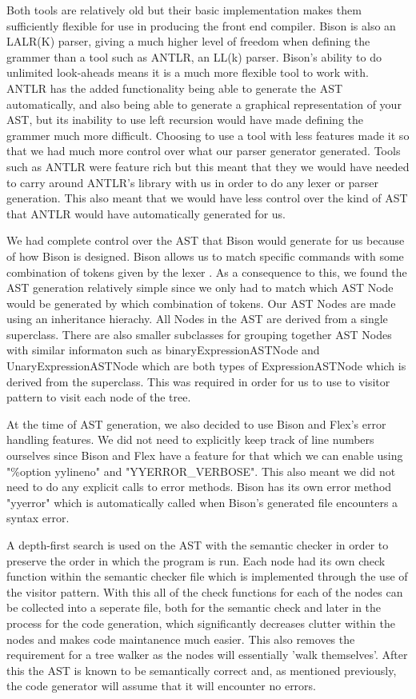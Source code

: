 \documentclass[8pt, a4paper]{article}
\begin{document}
Both tools are relatively old but their basic implementation makes them sufficiently flexible for use in producing the front end compiler. Bison is also an LALR(K) parser, giving a much higher level of freedom when defining the grammer than a tool such as ANTLR, an LL(k) parser. Bison's ability to do unlimited look-aheads means it is a much more flexible tool to work with. ANTLR has the added functionality being able to generate the AST automatically, and also being able to generate a graphical representation of your AST, but its inability to use left recursion would have made defining the grammer much more difficult. Choosing to use a tool with less features made it so that we had much more control over what our parser generator generated. Tools such as ANTLR were feature rich but this meant that they we would have needed to carry around ANTLR's library with us in order to do any lexer or parser generation. This also meant that we would have less control over the kind of AST that ANTLR would have automatically generated for us.

We had complete control over the AST that Bison would generate for us because of how Bison is designed. Bison allows us to match specific commands with some combination of tokens given by the lexer . As a consequence to this, we found the AST generation relatively simple since we only had to match which AST Node would be generated by which combination of tokens. Our AST Nodes are made using an inheritance hierachy. All Nodes in the AST are derived from a single superclass. There are also smaller subclasses for grouping together AST Nodes with similar informaton such as binaryExpressionASTNode and UnaryExpressionASTNode which are both types of ExpressionASTNode which is derived from the superclass. This was required in order for us to use to visitor pattern to visit each node of the tree.  

At the time of AST generation, we also decided to use Bison and Flex's error handling features. We did not need to explicitly keep track of line numbers ourselves since Bison and Flex have a feature for that which we can enable using "\%option yylineno" and "YYERROR\_VERBOSE". This also meant we did not need to do any explicit calls to error methods. Bison has its own error method "yyerror" which is automatically called when Bison's generated file encounters a syntax error.

A depth-first search is used on the AST with the semantic checker in order to preserve the order in which the program is run. Each node had its own check function within the semantic checker file which is implemented through the use of the visitor pattern. With this all of the check functions for each of the nodes can be collected into a seperate file, both for the semantic check and later in the process for the code generation, which significantly decreases clutter within the nodes and makes code maintanence much easier. This also removes the requirement for a tree walker as the nodes will essentially 'walk themselves'. After this the AST is known to be semantically correct and, as mentioned previously, the code generator will assume that it will encounter no errors.
\end{document}
